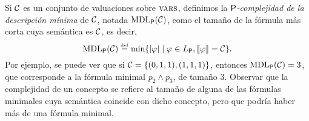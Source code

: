 Si $\mathcal{C}$ es un conjunto de valuaciones sobre $\textsc{vars}$, definimos la {\em ${\sf P}$-complejidad de la descripción mínima} de $\mathcal{C}$, notada ${\rm MDL}_{{\sf P}}(\mathcal{C})$, como el tamaño de la fórmula más corta cuya semántica es $\mathcal{C}$, es decir,
$$
{\rm MDL}_{{\sf P}}(\mathcal{C})\stackrel{\scriptscriptstyle \mathrm{def}}{=}\min\{|\varphi|\mid \varphi\in L_{\sf P},\llbracket \varphi\rrbracket=\mathcal{C}\}.
$$
Por ejemplo, se puede ver que si $\mathcal{C}=\{(0,1,1), (1,1,1)\}$, entonces ${\rm MDL}_{{\sf P}}(\mathcal{C})=3$, que corresponde a la fórmula minimal $p_2\wedge p_3$, de tamaño 3. Observar que la complejidad de un concepto se refiere al tamaño de alguna de las fórmulas minimales cuya semántica coincide con dicho concepto, pero que podría haber más de una fórmula minimal.


    
    
\renewcommand{\thetable}{\arabic{chapter}.\arabic{figure}}
\renewcommand{\thefigure}{\arabic{chapter}.\arabic{figure}}    




